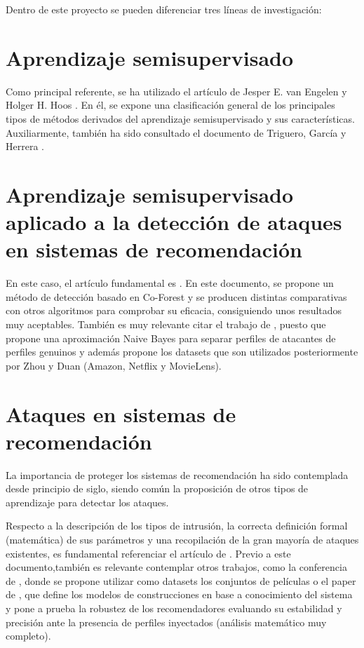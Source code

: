 
Dentro de este proyecto se pueden diferenciar tres líneas de investigación:


\section{Aprendizaje semisupervisado}

Como principal referente, se ha utilizado el artículo de Jesper E. van Engelen y Holger H. Hoos \citep{engelen-hoos}. En él, se expone una clasificación general de los principales tipos de métodos derivados del aprendizaje semisupervisado y sus características. Auxiliarmente, también ha sido consultado el documento de Triguero, García y Herrera \citep{triguero-garcia-herrera}. 


\section{Aprendizaje semisupervisado aplicado a la detección de ataques en sistemas de recomendación}

En este caso, el artículo fundamental es \citep{zhou-duan}. En este documento, se propone un método de detección basado en Co-Forest y se producen distintas comparativas con otros algoritmos para comprobar su eficacia, consiguiendo unos resultados muy aceptables. También es muy relevante citar el trabajo de \citep{zhiang-junjie}, puesto que propone una aproximación Naive Bayes para separar perfiles de atacantes de perfiles genuinos y además propone los datasets que son utilizados posteriormente por Zhou y Duan (Amazon, Netflix y MovieLens).

\section{Ataques en sistemas de recomendación}

La importancia de proteger los sistemas de recomendación ha sido contemplada desde principio de siglo, siendo común la proposición de otros tipos de aprendizaje para detectar los ataques.

Respecto a la descripción de los tipos de intrusión, la correcta definición formal (matemática) de sus parámetros y una recopilación de la gran mayoría de ataques existentes, es fundamental referenciar el artículo de \citep{mingdan-qingshan}. Previo a este documento,también es relevante contemplar otros trabajos, como la conferencia de \citep{lam-riedl}, donde se propone utilizar como datasets los conjuntos de películas o el paper de \citep{mahony}, que define los modelos de construcciones en base a conocimiento del sistema y pone a prueba la robustez de los recomendadores evaluando su estabilidad y precisión ante la presencia de perfiles inyectados (análisis matemático muy completo).